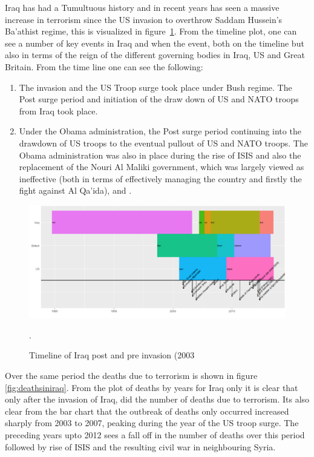 Iraq has had a Tumultuous history and in recent years has seen a massive increase in terrorism since the US invasion to overthrow Saddam Hussein's Ba'athist regime, this is visualized in figure~\ref{fig:timelineiraq}. From the timeline plot, one can see a number of key events in Iraq and when the event, both on the timeline but also in terms of the reign of the different governing bodies in Iraq, US and Great Britain. From the time line one can see the following:
\begin{enumerate}
\item The invasion and the US Troop surge took place under Bush regime. The Post surge period and initiation of the draw down of US and NATO troops from Iraq took place.  
\item  Under the Obama administration, the Post surge period continuing into the drawdown of US troops to the eventual pullout of US and NATO troops. The Obama administration was also in place during the rise of ISIS and also the replacement of the Nouri Al Maliki government, which was largely viewed as ineffective (both in terms of effectively managing the country and firstly the fight against Al Qa'ida), \citep{simon2008price} and \citep{kuoti2016exclusion}.
\end{enumerate}

\begin{figure}[t]
\includegraphics[width=15cm]{Peters_experiment_markdown_files/figure-latex/CaptureTimelineIraq.png}
\caption{Timeline of Iraq post and pre invasion (2003}.
\label{fig:timelineiraq}
\centering
\end{figure}

Over the same period the deaths due to terrorism is shown in figure~ \ref{fig:deathsiniraq}. From the plot of deaths by years for Iraq only it is clear that only after the invasion of Iraq, did the number of deaths due to terrorism. Its also clear from the bar chart that the outbreak of deaths only occurred increased sharply from 2003 to 2007, peaking during the year of the US troop surge.  The preceding years upto 2012 sees a fall off in the number of deaths over this period followed by rise of ISIS \citep{sekulow2015rise} and the resulting civil war in neighbouring Syria. 

